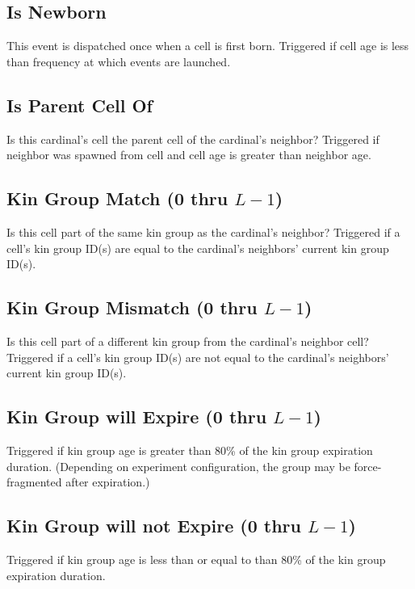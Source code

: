 \subsection{Is Newborn}

This event is dispatched once when a cell is first born.
Triggered if cell age is less than frequency at which events are launched.

\subsection{Is Parent Cell Of}

Is this cardinal's cell the parent cell of the cardinal's neighbor?
Triggered if neighbor was spawned from cell and cell age is greater than neighbor age.

\subsection{Kin Group Match (0 thru $L-1$)}

Is this cell part of the same kin group as the cardinal's neighbor?
Triggered if a cell's kin group ID(s) are equal to the cardinal's neighbors' current kin group ID(s).

\subsection{Kin Group Mismatch (0 thru $L-1$)}

Is this cell part of a different kin group from the cardinal's neighbor cell?
Triggered if a cell's kin group ID(s) are not equal to the cardinal's neighbors' current kin group ID(s).

\subsection{Kin Group will Expire (0 thru $L-1$)}

Triggered if kin group age is greater than 80\% of the kin group expiration duration.
(Depending on experiment configuration, the group may be force-fragmented after expiration.)

\subsection{Kin Group will not Expire (0 thru $L-1$)}

Triggered if kin group age is less than or equal to than 80\% of the kin group expiration duration.

